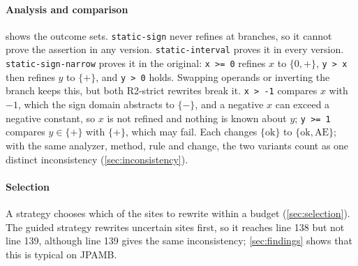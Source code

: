 \paragraph{Analysis and comparison}
 shows the outcome sets. \texttt{static-sign} never refines
at branches, so it cannot prove the assertion in any version.
\texttt{static-interval} proves it in every version. \texttt{static-sign-narrow}
proves it in the original: \texttt{x >= 0} refines $x$ to $\{0,+\}$,
\texttt{y > x} then refines $y$ to $\{+\}$, and \texttt{y > 0} holds. Swapping
operands or inverting the branch keeps this, but both R2-strict rewrites break
it. \texttt{x > -1} compares $x$ with $-1$, which the sign domain abstracts to
$\{-\}$, and a negative $x$ can exceed a negative constant, so $x$ is not
refined and nothing is known about $y$; \texttt{y >= 1}
compares $y\in\{+\}$ with $\{+\}$, which may fail. Each changes
$\{\mathrm{ok}\}$ to $\{\mathrm{ok}, \mathrm{AE}\}$; with the same analyzer,
method, rule and change, the two variants count as one distinct inconsistency
(\cref{sec:inconsistency}).

\paragraph{Selection}
A strategy chooses which of the \NumSites{} sites to rewrite within a budget
(\cref{sec:selection}). The guided strategy rewrites uncertain sites first, so
it reaches line 138 but not line 139, although line 139 gives the same
inconsistency; \cref{sec:findings} shows that this is typical on JPAMB.
